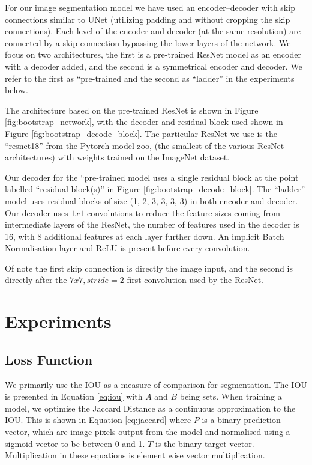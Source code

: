 For our image segmentation model we have used an encoder--decoder with skip connections similar to UNet \cite{Ronneberger2015} (utilizing padding and without cropping the skip connections). Each level of the encoder and decoder (at the same resolution) are connected by a skip connection bypassing the lower layers of the network. We focus on two architectures, the first is a pre-trained ResNet model as an encoder with a decoder added, and the second is a symmetrical encoder and decoder. We refer to the first as ``pre-trained and the second as ``ladder'' in the experiments below.

The architecture based on the pre-trained ResNet is shown in Figure \ref{fig:bootstrap_network}, with the decoder and residual block used shown in Figure \ref{fig:bootstrap_decode_block}. The particular ResNet we use is the ``resnet18'' from the Pytorch model zoo, (the smallest of the various ResNet architectures) with weights trained on the ImageNet dataset. 

Our decoder for the ``pre-trained model uses a single residual block at the point labelled ``residual block(s)'' in Figure \ref{fig:bootstrap_decode_block}. The ``ladder'' model uses residual blocks of size (1, 2, 3, 3, 3, 3) in both encoder and decoder. Our decoder uses $ 1x1 $ convolutions to reduce the feature sizes coming from intermediate layers of the ResNet, the number of features used in the decoder is 16, with 8 additional features at each layer further down. An implicit Batch Normalisation layer and ReLU is present before every convolution.

Of note the first skip connection is directly the image input, and the second is directly after the $7x7, stride=2$ first convolution used by the ResNet.


\section {Experiments}


\subsection {Loss Function}


We primarily use the \gls{IOU} as a measure of comparison for segmentation. The \gls{IOU} is presented in Equation \ref{eq:iou} with $ A $ and $ B $ being sets. When training a model, we optimise the Jaccard Distance as a continuous approximation to the \gls{IOU}. This is shown in Equation \ref{eq:jaccard} where $ P $ is a binary prediction vector, which are image pixels output from the model and normalised using a sigmoid vector to be between 0 and 1. $ T $ is the binary target vector. Multiplication in these equations is element wise vector multiplication.


